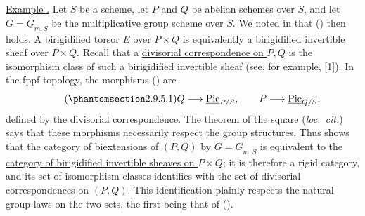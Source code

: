 \underline{Example .} Let $S$ be a scheme, let $P$ and $Q$ be
abelian schemes over $S$, and let $G=\underline G_{m,S}$ be the
multiplicative group scheme over $S$. We noted in  that
() then holds. A birigidified torsor $E$ over $P\times Q$ is
equivalently a birigidified invertible sheaf over $P\times Q$. Recall
that a \underline{divisorial correspondence on $P,Q$} is the
isomorphism class of such a birigidified invertible sheaf (see, for
example, [1]). In the fppf topology, the morphisms () are
\begin{equation}\tag{\SGARefTarget{sga7.sga7i.evii.n2-9-5-1}{2.9.5.1}}
 Q\longrightarrow\underline{\operatorname{Pic}}_{P/S},
 \qquad
 P\longrightarrow\underline{\operatorname{Pic}}_{Q/S},
\end{equation}
defined by the divisorial correspondence. The theorem of the square
(\emph{loc.\ cit.}) says that these morphisms necessarily respect the
group structures. Thus  shows that
\underline{the category of biextensions of $(P,Q)$ by
$G=\underline G_{m,S}$ is equivalent to the category of birigidified
invertible sheaves on $P\times Q$}; it is therefore a rigid category,
and its set of isomorphism classes identifies with the set of
divisorial correspondences on $(P,Q)$. This identification plainly
respects the natural group laws on the two sets, the first being that
of ().

